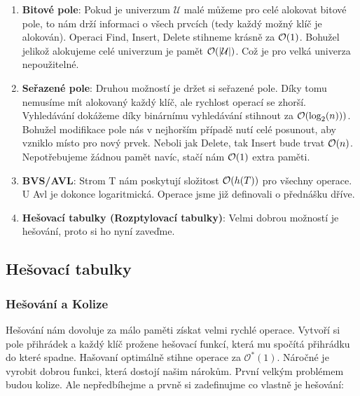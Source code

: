 \begin{enumerate}
    \item \textbf{Bitové pole}:
    Pokud je univerzum $\mathcal{U}$ malé můžeme pro celé alokovat bitové pole, to nám drží informaci o všech prvcích (tedy každý možný klíč je alokován). Operaci Find, Insert, Delete stihneme krásně za $\mathcal{O}(1)$. Bohužel jelikož alokujeme celé univerzum je pamět $\mathcal{O}(|\mathcal{U}|)$. Což je pro velká univerza nepoužitelné.
    
    \item \textbf{Seřazené pole}:
    Druhou možností je držet si seřazené pole. Díky tomu nemusíme mít alokovaný každý klíč, ale rychlost operací se zhorší. Vyhledávání dokážeme díky binárnímu vyhledávání stihnout za $\mathcal{O}(\log_2(n)))$. Bohužel modifikace pole nás v nejhorším případě nutí celé posunout, aby vzniklo místo pro nový prvek. Neboli jak Delete, tak Insert bude trvat $\mathcal{O}(n)$. Nepotřebujeme žádnou pamět navíc, stačí nám $\mathcal{O}(1)$ extra paměti.
    
    \item \textbf{BVS/AVL}:
    Strom T nám poskytují složitost $\mathcal{O}(h(T))$ pro všechny operace. U Avl je dokonce logaritmická. Operace jsme již definovali o přednášku dříve.
    
    \item \textbf{Hešovací tabulky (Rozptylovací tabulky)}:
    Velmi dobrou možností je hešování, proto si ho nyní zaveďme.
\end{enumerate}

\newpage

\subsection{Hešovací tabulky}

\subsubsection{Hešování a Kolize}

Hešování nám dovoluje za málo paměti získat velmi rychlé operace. Vytvoří si pole přihrádek a každý klíč prožene hešovací funkcí, která mu spočítá přihrádku do které spadne. Hašovaní optimálně stihne operace za $\mathcal{O}^*(1)$. Náročné je vyrobit dobrou funkci, která dostojí našim nárokům. První velkým problémem budou kolize. Ale nepředbíhejme a prvně si zadefinujme co vlastně je hešování:

